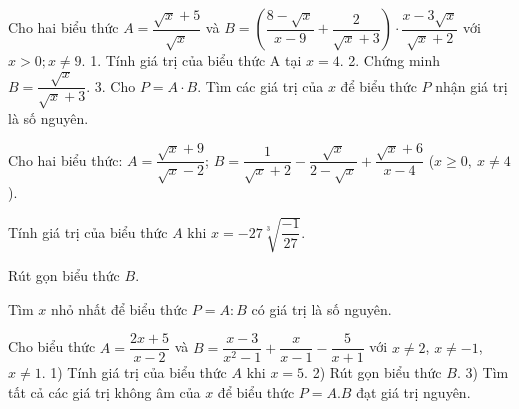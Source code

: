 \documentclass[12pt]{article}
\begin{document}
\begin{bt}

Cho hai biểu thức $A = \dfrac{\sqrt{x}+5}{\sqrt{x}}$ và $B = \left(\dfrac{8-\sqrt{x}}{x-9} + \dfrac{2}{\sqrt{x}+3}\right) \cdot \dfrac{x-3\sqrt{x}}{\sqrt{x}+2}$ với $x > 0; x \ne 9$.
1. Tính giá trị của biểu thức A tại $x = 4$.
2. Chứng minh $B = \dfrac{\sqrt{x}}{\sqrt{x}+3}$.
3. Cho $P = A \cdot B$. Tìm các giá trị của $x$ để biểu thức $P$ nhận giá trị là số nguyên.
\end{bt}

\begin{bt}
Cho hai biểu thức: $A=\dfrac{\sqrt{x}+9}{\sqrt{x}-2}$; $B=\dfrac{1}{\sqrt{x}+2}-\dfrac{\sqrt{x}}{2-\sqrt{x}}+\dfrac{\sqrt{x}+6}{x-4}$ ($x\ge 0,\ x\ne 4$).
\begin{cacy}
\item Tính giá trị của biểu thức $A$ khi $x=-27\sqrt[3]{\dfrac{-1}{27}}$.
\item Rút gọn biểu thức $B$.
\item Tìm $x$ nhỏ nhất để biểu thức $P=A:B$ có giá trị là số nguyên.
\end{cacy}
\loigiai{}
\end{bt}

\begin{bt}

Cho biểu thức $A = \dfrac{2x+5}{x-2}$ và $B = \dfrac{x-3}{x^2-1} + \dfrac{x}{x-1} - \dfrac{5}{x+1}$ với $x \ne 2$, $x \ne -1$, $x \ne 1$.
1) Tính giá trị của biểu thức $A$ khi $x = 5$.
2) Rút gọn biểu thức $B$.
3) Tìm tất cả các giá trị không âm của $x$ để biểu thức $P = A.B$ đạt giá trị nguyên.
\loigiai{
}
\end{bt}
\end{document}

